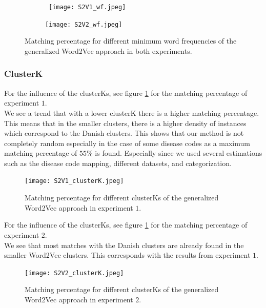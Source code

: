 \begin{figure}[!htb]
	\centering
	\begin{subfigure}[b]{.49\textwidth}\
		\texttt{[image: S2V1\_wf.jpeg]}
	\end{subfigure}
	\begin{subfigure}[b]{.49\textwidth}
		\texttt{[image: S2V2\_wf.jpeg]}
	\end{subfigure}
	\caption{Matching percentage for different minimum word frequencies of the generalized Word2Vec approach in both experiments.}
	\label{fig:s2v_wf}
\end{figure}



\subsubsection{ClusterK}

For the influence of the clusterKs, see figure \ref{fig:s2v_wf} for the matching percentage of experiment $1$. \\
We see a trend that with a lower clusterK there is a higher matching percentage. This means that in the smaller clusters, there is a higher density of instances which correspond to the Danish clusters. This shows that our method is not completely random especially in the case of some disease codes as a maximum matching percentage of $55$\% is found. Especially since we used several estimations such as the disease code mapping, different datasets, and categorization. \\

\begin{figure}[!htb]
	\centering
	\texttt{[image: S2V1\_clusterK.jpeg]}
	\caption{Matching percentage for different clusterKs of the generalized Word2Vec approach in experiment $1$.}
	\label{fig:s2v_clusterK_1}
\end{figure}



\noindent For the influence of the clusterKs, see figure \ref{fig:s2v_wf} for the matching percentage of experiment $2$.\\
We see that most matches with the Danish clusters are already found in the smaller Word2Vec clusters. This corresponds with the results from experiment $1$.

\begin{figure}[!htb]
	\centering
	\texttt{[image: S2V2\_clusterK.jpeg]}
	\caption{Matching percentage for different clusterKs of the generalized Word2Vec approach in experiment $2$.}
	\label{fig:s2v_clusterK_2}
\end{figure}


